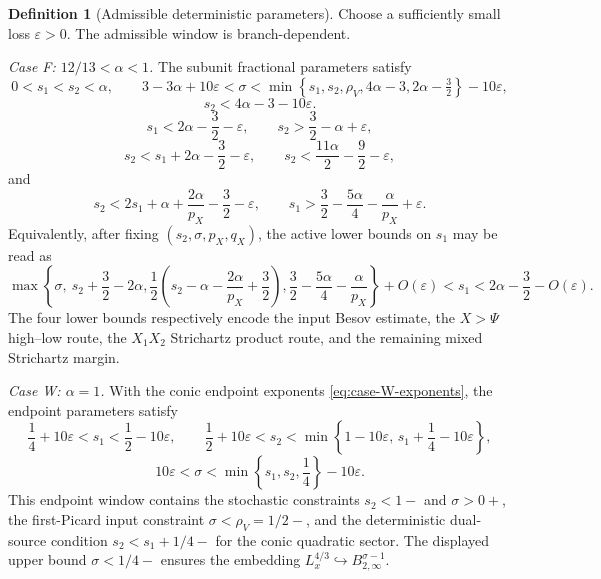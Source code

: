 \documentclass[10pt]{amsart}
\numberwithin{equation}{section}
\theoremstyle{plain}
\theoremstyle{definition}
\newtheorem{definition}[theorem]{Definition}
\theoremstyle{remark}
\newcommand{\eps}{\varepsilon}
\begin{document}
\begin{definition}[Admissible deterministic parameters]\label{def:admissible}
Choose a sufficiently small loss $\eps>0$.  The admissible window is branch-dependent.

\smallskip
\noindent\emph{Case F: $12/13<\alpha<1$.}  The subunit fractional parameters satisfy
\begin{equation}\label{eq:admissible-base}
0<s_1<s_2<\alpha,
\qquad
3-3\alpha+10\eps<\sigma<
\min\left\{s_1,s_2,\rho_V,4\alpha-3,2\alpha-\tfrac32\right\}-10\eps,
\end{equation}
\begin{equation}\label{eq:admissible-operator}
 s_2<4\alpha-3-10\eps.
\end{equation}
\begin{equation}\label{eq:admissible-lowhigh}
 s_1<2\alpha-\frac32-\eps,
 \qquad
 s_2>\frac32-\alpha+\eps,
\end{equation}
\begin{equation}\label{eq:admissible-high}
 s_2<s_1+2\alpha-\frac32-\eps,
 \qquad
 s_2<\frac{11\alpha}{2}-\frac92-\eps,
\end{equation}
and
\begin{equation}\label{eq:admissible-quadratic}
 s_2<2s_1+\alpha+\frac{2\alpha}{p_X}-\frac32-\eps,
 \qquad
 s_1>\frac32-\frac{5\alpha}{4}-\frac{\alpha}{p_X}+\eps.
\end{equation}
Equivalently, after fixing $(s_2,\sigma,p_X,q_X)$, the active lower bounds on $s_1$ may be read as
\begin{equation}\label{eq:s1-window}
\max\left\{\sigma,\ s_2+\frac32-2\alpha,
\frac12\left(s_2-\alpha-\frac{2\alpha}{p_X}+\frac32\right),
\frac32-\frac{5\alpha}{4}-\frac{\alpha}{p_X}\right\}+O(\eps)
<s_1<2\alpha-\frac32-O(\eps).
\end{equation}
The four lower bounds respectively encode the input Besov estimate, the $X>\Psi$ high--low route, the $X_1X_2$ Strichartz product route, and the remaining mixed Strichartz margin.


\smallskip
\noindent\emph{Case W: $\alpha=1$.}  With the conic endpoint exponents \eqref{eq:case-W-exponents}, the endpoint parameters satisfy
\begin{equation}\label{eq:admissible-case-W}
 \frac14+10\eps<s_1<\frac12-10\eps,
 \qquad
 \frac12+10\eps<s_2<\min\left\{1-10\eps,\,s_1+\frac14-10\eps\right\},
\end{equation}
\begin{equation}\label{eq:admissible-case-W-sigma}
 10\eps<\sigma<\min\left\{s_1,s_2,\frac14\right\}-10\eps.
\end{equation}
This endpoint window contains the stochastic constraints $s_2<1-$ and $\sigma>0+$, the first-Picard input constraint $\sigma<\rho_V=1/2-$, and the deterministic dual-source condition $s_2<s_1+1/4-$ for the conic quadratic sector.  The displayed upper bound $\sigma<1/4-$ ensures the embedding $L_x^{4/3}\hookrightarrow B_{2,\infty}^{\sigma-1}$.


\end{definition}
\end{document}
